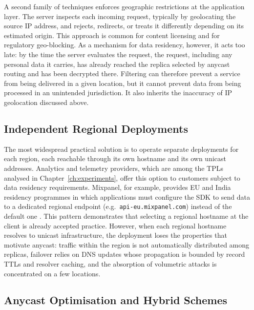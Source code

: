 A second family of techniques enforces geographic restrictions at the application layer. The server inspects each incoming request, typically by geolocating the source IP address, and rejects, redirects, or treats it differently depending on its estimated origin. This approach is common for content licensing and for regulatory geo-blocking. As a mechanism for data residency, however, it acts too late: by the time the server evaluates the request, the request, including any personal data it carries, has already reached the replica selected by anycast routing and has been decrypted there. Filtering can therefore prevent a service from being delivered in a given location, but it cannot prevent data from being processed in an unintended jurisdiction. It also inherits the inaccuracy of IP geolocation discussed above.

\subsection{Independent Regional Deployments}
\label{sc:rcadns_related_regional}

The most widespread practical solution is to operate separate deployments for each region, each reachable through its own hostname and its own unicast addresses. Analytics and telemetry providers, which are among the TPLs analysed in Chapter~\ref{ch:experiments}, offer this option to customers subject to data residency requirements. Mixpanel, for example, provides EU and India residency programmes in which applications must configure the SDK to send data to a dedicated regional endpoint (e.g.\ \texttt{api-eu.mixpanel.com}) instead of the default one \cite{EUMixpanel}. This pattern demonstrates that selecting a regional hostname at the client is already accepted practice. However, when each regional hostname resolves to unicast infrastructure, the deployment loses the properties that motivate anycast: traffic within the region is not automatically distributed among replicas, failover relies on DNS updates whose propagation is bounded by record TTLs and resolver caching, and the absorption of volumetric attacks is concentrated on a few locations.

\subsection{Anycast Optimisation and Hybrid Schemes}
\label{sc:rcadns_related_optimisation}

